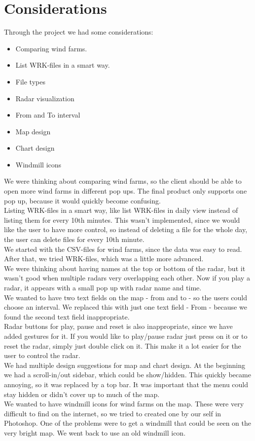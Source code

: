 \chapter{Considerations}
Through the project we had some considerations:
\begin{itemize}
\item Comparing wind farms.
\item List WRK-files in a smart way.
\item File types
\item Radar visualization
\item From and To interval
\item Map design
\item Chart design
\item Windmill icons
\end{itemize}
We were thinking about comparing wind farms, so the client should be able to open more wind farms in different pop ups. The final product only supports one pop up, because it would quickly become confusing.\\
Listing WRK-files in a smart way, like list WRK-files in daily view instead of listing them for every 10th minutes. This wasn't implemented, since we would like the user to have more control, so instead of deleting a file for the whole day, the user can delete files for every 10th minute.\\
We started with the CSV-files for wind farms, since the data was easy to read. After that, we tried WRK-files, which was a little more advanced.\\
We were thinking about having names at the top or bottom of the radar, but it wasn't good when multiple radars very overlapping each other. Now if you play a radar, it appears with a small pop up with radar name and time.\\
We wanted to have two text fields on the map - from and to - so the users could choose an interval. We replaced this with just one text field - From - because we found the second text field inappropriate.\\
Radar buttons for play, pause and reset is also inappropriate, since we have added gestures for it. If you would like to play/pause radar just press on it or to reset the radar, simply just double click on it. This make it a lot easier for the user to control the radar.\\
We had multiple design suggestions for map and chart design. At the beginning we had a scroll-in/out sidebar, which could be show/hidden. This quickly became annoying, so it was replaced by a top bar. It was important that the menu could stay hidden or didn't cover up to much of the map.\\
We wanted to have windmill icons for wind farms on the map. These were very difficult to find on the internet, so we tried to created one by our self in Photoshop. One of the problems were to get a windmill that could be seen on the very bright map. We went back to use an old windmill icon.\\
